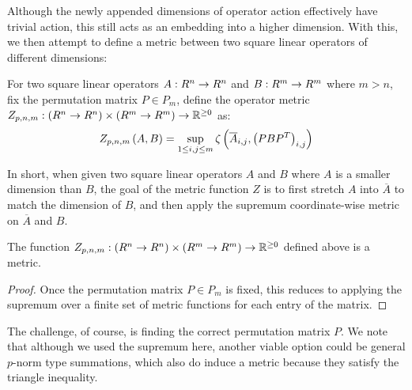 Although the newly appended dimensions of operator action
effectively have trivial action, this still acts as an embedding into
a higher dimension.
With this, we then attempt to define a metric between
two square linear operators of different dimensions:
\begin{definition}
  For two square linear operators
  \(A : R^n \to R^n\) and \(B : R^m \to R^m\) where \(m > n\),
  fix the permutation matrix \(P \in P_m\),
  define the operator metric
  \(Z_{p, n, m} : \left(R^n \to R^n\right) \times \left(R^m \to R^m\right) \to \mathbb{R}^{\geq 0}\) as:
  \begin{align*}
    Z_{p, n, m}\left(A, B\right) =
      \sup_{1 \leq i, j \leq m}
        \zeta\left(\overline{A}_{i, j}, \left(PB{P}^T\right)_{i, j}\right)
  \end{align*}
\end{definition}
In short, when given two square linear operators
\(A\) and \(B\) where \(A\)
is a smaller dimension than \(B\), the goal of the metric function \(Z\)
is to first stretch \(A\) into \(\overline{A}\)
to match the dimension of \(B\),
and then apply the supremum coordinate-wise metric
on \(\overline{A}\) and \(B\).

\begin{theorem}
  The function
  \(Z_{p, n, m} : \left(R^n \to R^n\right) \times \left(R^m \to R^m\right) \to \mathbb{R}^{\geq 0}\) 
  defined above is a metric.
\end{theorem}
\begin{proof}
  Once the permutation matrix \(P \in P_m\) is fixed, this reduces to
  applying the supremum over a finite set of metric functions
  for each entry of the matrix.
\end{proof}

The challenge, of course, is finding the correct permutation matrix \(P\).
We note that although we used the supremum here, another viable option
could be general \(p\)-norm type summations,
which also do induce a metric because they satisfy the triangle inequality.


